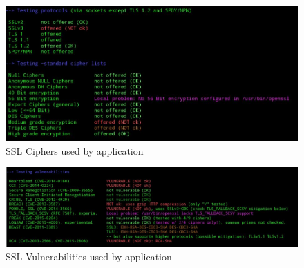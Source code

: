 	\begin{figure}[h!tbp]
		\centering
		\includegraphics[width=\textwidth]{figures/t07_ssl_cipher.png}
		\caption{SSL Ciphers used by \bs{} application}
		\label{figure:bs_ssl_cipher}
	\end{figure}
	\begin{figure}[h!tbp]
		\centering
		\includegraphics[width=\textwidth]{figures/t07_ssl_vuln.png}
		\caption{SSL Vulnerabilities used by \bs{} application}
		\label{figure:bs_ssl_vuln}
	\end{figure}

